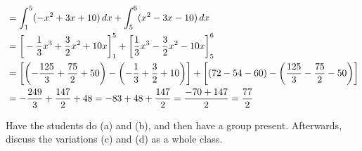 \documentclass[noinstructornotes]{ximera}
\begin{document}
\begin{problem}
\begin{enumerate}
\begin{freeResponse}
\begin{align*}
			&= \int_1^5 (-x^2 + 3x + 10) \,d x + \int_5^6 (x^2 - 3x - 10) \,d x  \\
			&= \bigg[ -\frac{1}{3} x^3 + \frac{3}{2} x^2 + 10x \bigg]_1^5 + \bigg[ \frac{1}{3} x^3 - \frac{3}{2} x^2 - 10x \bigg]_5^6  \\
			&= \left[ \left(- \frac{125}{3} + \frac{75}{2} + 50 \right) - \left( - \frac{1}{3} + \frac{3}{2} + 10 \right) \right] + \left[ \left( 72 - 54 - 60 \right) - \left( \frac{125}{3} - \frac{75}{2} - 50 \right) \right]  \\
			&= - \frac{249}{3} + \frac{147}{2} + 48  = -83 + 48 + \frac{147}{2} = \frac{-70 + 147}{2} = \frac{77}{2}  
			\end{align*}
		\end{freeResponse}
		
	\end{enumerate}
	
\end{problem}

\begin{instructorNotes}
Have the students do (a) and (b), and then have a group present.  
Afterwards, discuss the variations (c) and (d) as a whole class.
\end{instructorNotes}
\end{document}
